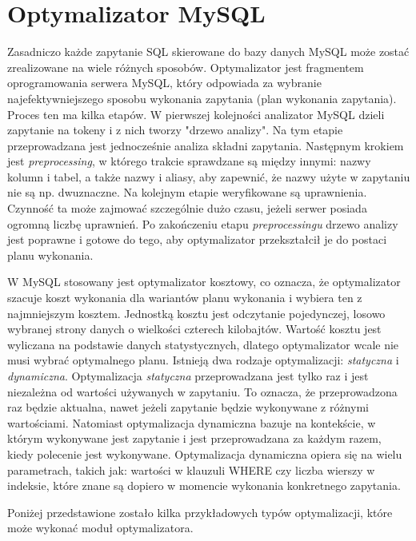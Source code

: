 \section{Optymalizator MySQL}

Zasadniczo każde zapytanie SQL skierowane do bazy danych MySQL może zostać zrealizowane na wiele różnych sposobów. Optymalizator jest fragmentem oprogramowania serwera MySQL, który odpowiada za wybranie najefektywniejszego sposobu wykonania zapytania (plan wykonania zapytania).
Proces ten ma kilka etapów. W pierwszej kolejności analizator MySQL dzieli zapytanie na tokeny i z nich tworzy "drzewo analizy". Na tym etapie przeprowadzana jest jednocześnie analiza składni zapytania. Następnym krokiem jest \textit{preprocessing}, w którego trakcie sprawdzane są między innymi: nazwy kolumn i tabel, a także nazwy i aliasy, aby zapewnić, że nazwy użyte w zapytaniu nie są np. dwuznaczne. Na kolejnym etapie weryfikowane są uprawnienia. Czynność ta może zajmować szczególnie dużo czasu, jeżeli serwer posiada ogromną liczbę uprawnień. Po zakończeniu etapu \textit{preprocessingu} drzewo analizy jest poprawne i gotowe do tego, aby optymalizator przekształcił je do postaci planu wykonania.

W MySQL stosowany jest optymalizator kosztowy, co oznacza, że optymalizator szacuje koszt wykonania dla wariantów planu wykonania i wybiera ten z najmniejszym kosztem. Jednostką kosztu jest odczytanie pojedynczej, losowo wybranej strony danych o wielkości czterech kilobajtów. Wartość kosztu jest wyliczana na podstawie danych statystycznych, dlatego optymalizator wcale nie musi wybrać optymalnego planu. Istnieją dwa rodzaje optymalizacji: \textit{statyczna} i \textit{dynamiczna}. Optymalizacja \textit{statyczna} przeprowadzana jest tylko raz i jest niezależna od wartości używanych w zapytaniu. To oznacza, że przeprowadzona raz będzie aktualna, nawet jeżeli zapytanie będzie wykonywane z różnymi wartościami. Natomiast optymalizacja dynamiczna bazuje na kontekście, w którym wykonywane jest zapytanie i jest przeprowadzana za każdym razem, kiedy polecenie jest wykonywane. Optymalizacja dynamiczna opiera się na wielu parametrach, takich jak: wartości w klauzuli WHERE czy liczba wierszy w indeksie, które znane są dopiero w momencie wykonania konkretnego zapytania.

Poniżej przedstawione zostało kilka przykładowych typów optymalizacji, które może wykonać moduł optymalizatora.

